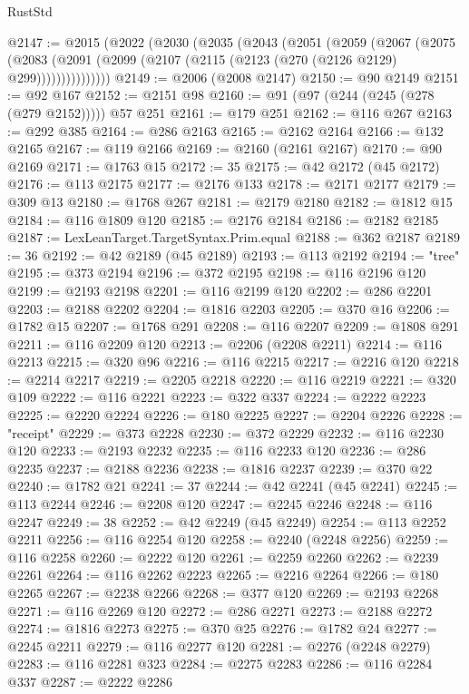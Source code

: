 \begin{lexlean}{RustStd}
\begin{coremodule}
@2147 := @2015
    (@2022
      (@2030
        (@2035
          (@2043
            (@2051
              (@2059
                (@2067
                  (@2075
                    (@2083
                      (@2091 (@2099 (@2107 (@2115 (@2123 (@270 (@2126 @2129) @299)))))))))))))))
@2149 := @2006 (@2008 @2147)
@2150 := @90 @2149
@2151 := @92 @167
@2152 := @2151 @98
@2160 := @91 (@97 (@244 (@245 (@278 (@279 @2152))))) @57 @251
@2161 := @179 @251
@2162 := @116 @267
@2163 := @292 @385
@2164 := @286 @2163
@2165 := @2162 @2164
@2166 := @132 @2165
@2167 := @119 @2166
@2169 := @2160 (@2161 @2167)
@2170 := @90 @2169
@2171 := @1763 @15
@2172 := 35
@2175 := @42 @2172 (@45 @2172)
@2176 := @113 @2175
@2177 := @2176 @133
@2178 := @2171 @2177
@2179 := @309 @13
@2180 := @1768 @267
@2181 := @2179 @2180
@2182 := @1812 @15
@2184 := @116 @1809 @120
@2185 := @2176 @2184
@2186 := @2182 @2185
@2187 := LexLeanTarget.TargetSyntax.Prim.equal
@2188 := @362 @2187
@2189 := 36
@2192 := @42 @2189 (@45 @2189)
@2193 := @113 @2192
@2194 := "tree"
@2195 := @373 @2194
@2196 := @372 @2195
@2198 := @116 @2196 @120
@2199 := @2193 @2198
@2201 := @116 @2199 @120
@2202 := @286 @2201
@2203 := @2188 @2202
@2204 := @1816 @2203
@2205 := @370 @16
@2206 := @1782 @15
@2207 := @1768 @291
@2208 := @116 @2207
@2209 := @1808 @291
@2211 := @116 @2209 @120
@2213 := @2206 (@2208 @2211)
@2214 := @116 @2213
@2215 := @320 @96
@2216 := @116 @2215
@2217 := @2216 @120
@2218 := @2214 @2217
@2219 := @2205 @2218
@2220 := @116 @2219
@2221 := @320 @109
@2222 := @116 @2221
@2223 := @322 @337
@2224 := @2222 @2223
@2225 := @2220 @2224
@2226 := @180 @2225
@2227 := @2204 @2226
@2228 := "receipt"
@2229 := @373 @2228
@2230 := @372 @2229
@2232 := @116 @2230 @120
@2233 := @2193 @2232
@2235 := @116 @2233 @120
@2236 := @286 @2235
@2237 := @2188 @2236
@2238 := @1816 @2237
@2239 := @370 @22
@2240 := @1782 @21
@2241 := 37
@2244 := @42 @2241 (@45 @2241)
@2245 := @113 @2244
@2246 := @2208 @120
@2247 := @2245 @2246
@2248 := @116 @2247
@2249 := 38
@2252 := @42 @2249 (@45 @2249)
@2254 := @113 @2252 @2211
@2256 := @116 @2254 @120
@2258 := @2240 (@2248 @2256)
@2259 := @116 @2258
@2260 := @2222 @120
@2261 := @2259 @2260
@2262 := @2239 @2261
@2264 := @116 @2262 @2223
@2265 := @2216 @2264
@2266 := @180 @2265
@2267 := @2238 @2266
@2268 := @377 @120
@2269 := @2193 @2268
@2271 := @116 @2269 @120
@2272 := @286 @2271
@2273 := @2188 @2272
@2274 := @1816 @2273
@2275 := @370 @25
@2276 := @1782 @24
@2277 := @2245 @2211
@2279 := @116 @2277 @120
@2281 := @2276 (@2248 @2279)
@2283 := @116 @2281 @323
@2284 := @2275 @2283
@2286 := @116 @2284 @337
@2287 := @2222 @2286

\end{coremodule}
\end{lexlean}
